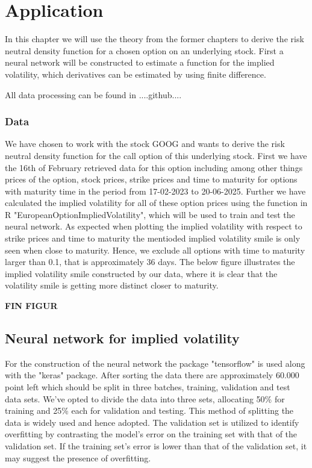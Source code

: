 \chapter{Application}\label{Ch.4}

In this chapter we will use the theory from the former chapters to derive the risk neutral density function for a chosen option on an underlying stock. First a neural network will be constructed to estimate a function for the implied volatility, which derivatives can be estimated by using finite difference. 

All data processing can be found in ....github....

\subsection{Data}
We have chosen to work with the stock GOOG and wants to derive the risk neutral density function for the call option of this underlying stock. First we have the 16th of February retrieved data for this option including among other things prices of the option, stock prices, strike prices and time to maturity for options with maturity time in the period from 17-02-2023 to 20-06-2025. Further we have calculated the implied volatility for all of these option prices using the function in R "EuropeanOptionImpliedVolatility", which will be used to train and test the neural network. As expected when plotting the implied volatility with respect to strike prices and time to maturity the mentioded implied volatility smile is only seen when close to maturity. Hence, we exclude all options with time to maturity larger than 0.1, that is approximately 36 days. The below figure illustrates the implied volatility smile constructed by our data, where it is clear that the volatility smile is getting more distinct closer to maturity. 

\textbf{FIN FIGUR}

\section{Neural network for implied volatility}
For the construction of the neural network the package "tensorflow" is used along with the "keras" package. After sorting the data there are approximately 60.000 point left which should be split in three batches, training, validation and test data sets. We've opted to divide the data into three sets, allocating 50\% for training and 25\% each for validation and testing. This method of splitting the data is widely used and hence adopted. The validation set is utilized to identify overfitting by contrasting the model's error on the training set with that of the validation set. If the training set's error is lower than that of the validation set, it may suggest the presence of overfitting.

